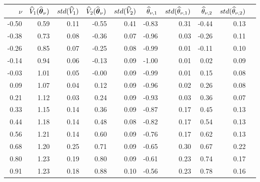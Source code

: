 \begin{tabular}{rrrrrrrrrr}\hline 
$\nu$  & $\widehat{V}_1(\widehat{\boldsymbol{\theta}}_{\nu})$ & $std(\widehat{V}_1)$ & $\widehat{V}_2(\widehat{\boldsymbol{\theta}}_{\nu})$ & $std(\widehat{V}_2)$ & $\widehat{\theta}_{\nu,1}$ & $std(\widehat{\theta}_{\nu,1})$ & $\widehat{\theta}_{\nu,2}$ & $std(\widehat{\theta}_{\nu,2})$ \\ \hline 
-0.50 &     0.59 &     0.11  &    -0.55 &      0.41 &     -0.83 &      0.31 &     -0.44 &      0.13 \\ 
-0.38 &     0.73 &     0.08  &    -0.36 &      0.07 &     -0.96 &      0.03 &     -0.26 &      0.11 \\ 
-0.26 &     0.85 &     0.07  &    -0.25 &      0.08 &     -0.99 &      0.01 &     -0.11 &      0.10 \\ 
-0.14 &     0.94 &     0.06  &    -0.13 &      0.09 &     -1.00 &      0.01 &      0.02 &      0.09 \\ 
-0.03 &     1.01 &     0.05  &    -0.00 &      0.09 &     -0.99 &      0.01 &      0.15 &      0.08 \\ 
 0.09 &     1.07 &     0.04  &     0.12 &      0.09 &     -0.96 &      0.02 &      0.26 &      0.08 \\ 
 0.21 &     1.12 &     0.03  &     0.24 &      0.09 &     -0.93 &      0.03 &      0.36 &      0.07 \\ 
 0.33 &     1.15 &     0.14  &     0.36 &      0.09 &     -0.87 &      0.17 &      0.45 &      0.13 \\ 
 0.44 &     1.18 &     0.14  &     0.48 &      0.08 &     -0.82 &      0.17 &      0.54 &      0.13 \\ 
 0.56 &     1.21 &     0.14  &     0.60 &      0.09 &     -0.76 &      0.17 &      0.62 &      0.13 \\ 
 0.68 &     1.20 &     0.25  &     0.71 &      0.09 &     -0.65 &      0.30 &      0.67 &      0.22 \\ 
 0.80 &     1.23 &     0.19  &     0.80 &      0.09 &     -0.61 &      0.23 &      0.74 &      0.17 \\ 
 0.91 &     1.23 &     0.18  &     0.88 &      0.10 &     -0.56 &      0.23 &      0.78 &      0.16 \\ 

\end{tabular}

